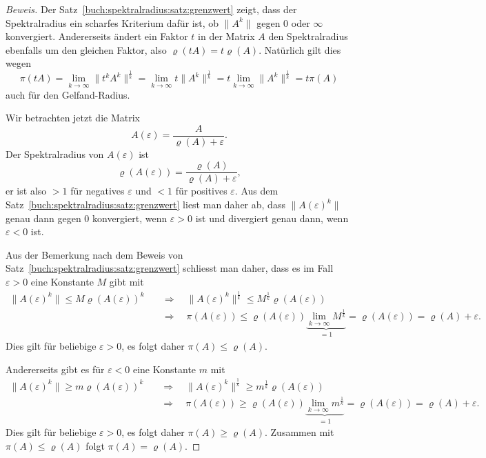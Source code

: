 \begin{proof}[Beweis]
Der Satz~\ref{buch:spektralradius:satz:grenzwert} zeigt, dass der
Spektralradius ein scharfes Kriterium dafür ist, ob $\|A^k\|$ 
gegen 0 oder $\infty$ konvergiert.
Andererseits ändert ein Faktor $t$ in der Matrix $A$ den Spektralradius
ebenfalls um den gleichen Faktor, also $\varrho(tA)=t\varrho(A)$.
Natürlich gilt dies wegen
\[
\pi(tA)
=
\lim_{k\to\infty} \|t^kA^k\|^\frac1k
=
\lim_{k\to\infty} t\|A^k\|^\frac1k
=
t\lim_{k\to\infty} \|A^k\|^\frac1k
=
t\pi(A)
\]
auch für den Gelfand-Radius.

Wir betrachten jetzt die Matrix
\[
A(\varepsilon) = \frac{A}{\varrho(A) + \varepsilon}.
\]
Der Spektralradius von $A(\varepsilon)$ ist
\[
\varrho(A(\varepsilon)) = \frac{\varrho(A)}{\varrho(A)+\varepsilon},
\]
er ist also $>1$ für negatives $\varepsilon$ und $<1$ für positives
$\varepsilon$.
Aus dem Satz~\ref{buch:spektralradius:satz:grenzwert} liest man daher ab,
dass $\|A(\varepsilon)^k\|$ genau dann gegen $0$ konvergiert, wenn
$\varepsilon > 0$ ist und divergiert genau dann, wenn $\varepsilon< 0$ ist.

Aus der Bemerkung nach dem Beweis von
Satz~\ref{buch:spektralradius:satz:grenzwert} schliesst man daher, dass 
es im Fall $\varepsilon > 0$ eine Konstante $M$ gibt mit
\begin{align*}
\|A(\varepsilon) ^k\|\le M\varrho(A(\varepsilon))^k
\quad&\Rightarrow\quad
\|A(\varepsilon) ^k\|^\frac1k\le M^\frac1k\varrho(A(\varepsilon))
\\
&\Rightarrow\quad
\pi(A(\varepsilon)) \le  \varrho(A(\varepsilon))
\underbrace{\lim_{k\to\infty} M^\frac1k}_{\displaystyle=1}
=
\varrho(A(\varepsilon))
=
\varrho(A)+\varepsilon.
\end{align*}
Dies gilt für beliebige $\varepsilon >0$, es folgt daher
$\pi(A) \le \varrho(A)$.

Andererseits gibt es für $\varepsilon <0$ eine Konstante $m$ mit
\begin{align*}
\|A(\varepsilon) ^k\|\ge m\varrho(A(\varepsilon))^k
\quad&\Rightarrow\quad
\|A(\varepsilon) ^k\|^\frac1k\ge m^\frac1k\varrho(A(\varepsilon))
\\
&\Rightarrow\quad
\pi(A(\varepsilon)) \ge  \varrho(A(\varepsilon))
\underbrace{\lim_{k\to\infty} m^\frac1k}_{\displaystyle=1}
=
\varrho(A(\varepsilon))
=
\varrho(A)+\varepsilon.
\end{align*}
Dies gilt für beliebige $\varepsilon> 0$, es folgt daher
$\pi(A) \ge \varrho(A)$.
Zusammen mit $\pi(A) \le \varrho(A)$ folgt $\pi(A)=\varrho(A)$.
\end{proof}

